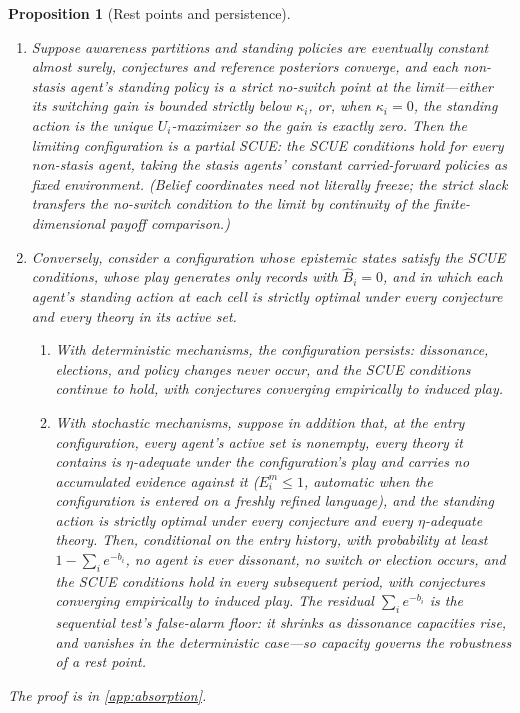 \documentclass[11pt]{article}
\newtheorem{proposition}[assumption]{Proposition}
\theoremstyle{definition}
\begin{document}
\begin{proposition}[Rest points and persistence]
\label{prop:rest-points}
\leavevmode
\begin{enumerate}[label=(\roman*)]
  \item Suppose awareness partitions and standing policies are eventually constant almost surely, conjectures and reference posteriors converge, and each non-stasis agent's standing policy is a strict no-switch point at the limit---either its switching gain is bounded strictly below $\kappa_i$, or, when $\kappa_i=0$, the standing action is the unique $U_i$-maximizer so the gain is exactly zero.
  Then the limiting configuration is a \emph{partial SCUE}: the SCUE conditions hold for every non-stasis agent, taking the stasis agents' constant carried-forward policies as fixed environment.
  (Belief coordinates need not literally freeze; the strict slack transfers the no-switch condition to the limit by continuity of the finite-dimensional payoff comparison.)
  \item Conversely, consider a configuration whose epistemic states satisfy the SCUE conditions, whose play generates only records with $\widehat B_i=0$, and in which each agent's standing action at each cell is strictly optimal under every conjecture and every theory in its active set.
  \begin{enumerate}[label=(\alph*)]
    \item With deterministic mechanisms, the configuration persists: dissonance, elections, and policy changes never occur, and the SCUE conditions continue to hold, with conjectures converging empirically to induced play.
    \item With stochastic mechanisms, suppose in addition that, at the entry configuration, every agent's active set is nonempty, every theory it contains is $\eta$-adequate under the configuration's play and carries no accumulated evidence against it ($E_i^{m}\le1$, automatic when the configuration is entered on a freshly refined language), and the standing action is strictly optimal under every conjecture and every $\eta$-adequate theory.
    Then, conditional on the entry history, with probability at least $1-\sum_i e^{-b_i}$, no agent is ever dissonant, no switch or election occurs, and the SCUE conditions hold in every subsequent period, with conjectures converging empirically to induced play.
    The residual $\sum_i e^{-b_i}$ is the sequential test's false-alarm floor: it shrinks as dissonance capacities rise, and vanishes in the deterministic case---so \emph{capacity governs the robustness of a rest point}.
  \end{enumerate}
\end{enumerate}
The proof is in \cref{app:absorption}.
\end{proposition}
\end{document}
